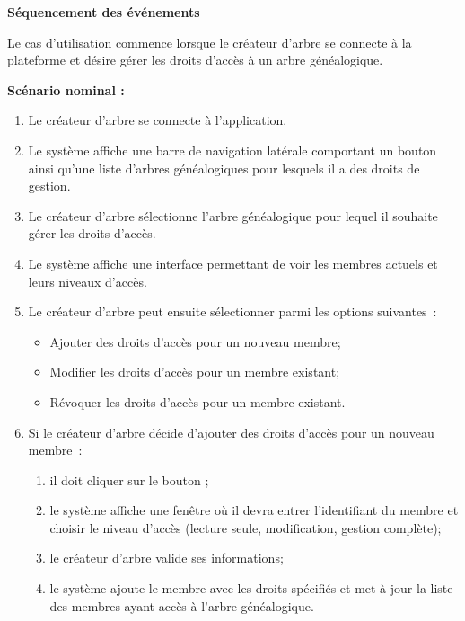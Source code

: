 \textbf{Séquencement des événements}

Le cas d’utilisation commence lorsque le créateur d'arbre se connecte à la
plateforme et désire gérer les droits d'accès à un arbre généalogique.

\textbf{Scénario nominal :}

\begin{enumerate}

  \item  Le créateur d'arbre se connecte à l’application.

  \item Le système affiche une barre de navigation latérale comportant un
    bouton  ainsi qu’une liste d’arbres
    généalogiques pour lesquels il a des droits de gestion.

  \item Le créateur d'arbre sélectionne l'arbre généalogique pour lequel il souhaite
    gérer les droits d'accès.

  \item Le système affiche une interface permettant de voir les membres
    actuels et leurs niveaux d'accès.

  \item Le créateur d'arbre peut ensuite sélectionner parmi les options suivantes :
    \begin{itemize}
      \item Ajouter des droits d'accès pour un nouveau membre;
      \item Modifier les droits d'accès pour un membre existant;
      \item Révoquer les droits d'accès pour un membre existant.
    \end{itemize}

  \item Si le créateur d'arbre décide d'ajouter des droits d'accès pour un nouveau membre :
    \begin{enumerate}
      \item il doit cliquer sur le bouton ;
      \item le système affiche une fenêtre où il devra entrer l'identifiant du
        membre et choisir le niveau d'accès (lecture seule,
        modification, gestion complète);
      \item le créateur d'arbre valide ses informations;
      \item le système ajoute le membre avec les droits spécifiés et met à
        jour la liste des membres ayant accès à l'arbre généalogique.
    \end{enumerate}


\end{enumerate}

